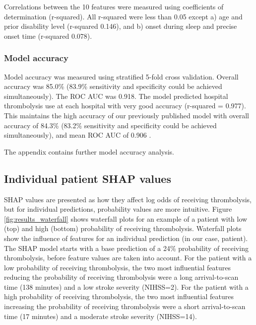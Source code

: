 Correlations between the 10 features were measured using coefficients of determination (r-squared). All r-squared were less than 0.05 except a) age and prior disability level (r-squared 0.146), and b) onset during sleep and precise onset time (r-squared 0.078).


\subsubsection{Model accuracy}

Model accuracy was measured using stratified 5-fold cross validation. Overall accuracy was 85.0\% (83.9\% sensitivity and specificity could be achieved simultaneously). The ROC AUC was 0.918. The model predicted hospital thrombolysis use at each hospital with very good accuracy (r-squared = 0.977). This maintains the high accuracy of our previously published model with overall accuracy of 84.3\% (83.2\% sensitivity and specificity could be achieved simultaneously), and mean ROC AUC of 0.906 \cite{allen_use_2022}.

The appendix contains further model accuracy analysis.

\subsection{Individual patient SHAP values}
SHAP values are presented as how they affect log odds of receiving thrombolysis, but for individual predictions, probability values are more intuitive. Figure \ref{fig:results_waterfall} shows waterfall plots for an example of a patient with low (top) and high (bottom) probability of receiving thrombolysis. Waterfall plots show the influence of features for an individual prediction (in our case, patient). The SHAP model starts with a base prediction of a 24\% probability of receiving thrombolysis, before feature values are taken into account. For the patient with a low probability of receiving thrombolysis, the two most influential features reducing the probability of receiving thrombolysis were a long arrival-to-scan time (138 minutes) and a low stroke severity (NIHSS=2). For the patient with a high probability of receiving thrombolysis, the two most influential features increasing the probability of receiving thrombolysis were a short arrival-to-scan time (17 minutes) and a moderate stroke severity (NIHSS=14). 

